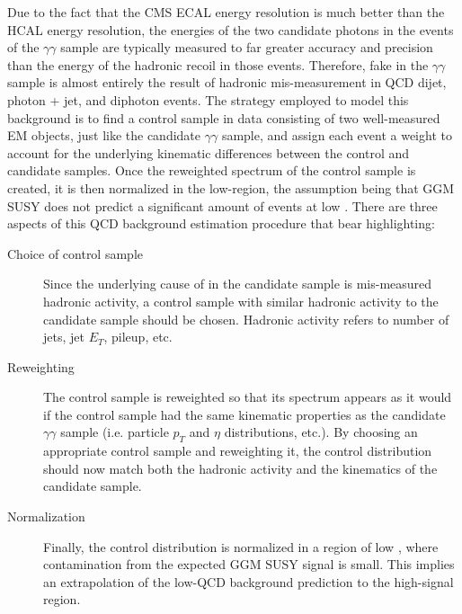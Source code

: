 \documentclass[dissertation.tex]{subfiles}
\begin{document}
Due to the fact that the CMS ECAL energy resolution is much better than the HCAL energy resolution, the energies of the two candidate photons in the events of the $\gamma\gamma$ sample are typically measured to far greater accuracy and precision than the energy of the hadronic recoil in those events.  Therefore, fake \MET in the $\gamma\gamma$ sample is almost entirely the result of hadronic mis-measurement in QCD dijet, photon + jet, and diphoton events.  The strategy employed to model this background is to find a control sample in data consisting of two well-measured EM objects, just like the candidate $\gamma\gamma$ sample, and assign each event a weight to account for the underlying kinematic differences between the control and candidate samples.  Once the reweighted \MET spectrum of the control sample is created, it is then normalized in the low-\MET region, the assumption being that GGM SUSY does not predict a significant amount of events at low \MET.  There are three aspects of this QCD background estimation procedure that bear highlighting:

\begin{description}
\item[Choice of control sample] Since the underlying cause of \MET in the candidate sample is mis-measured hadronic activity, a control sample with similar hadronic activity to the candidate sample should be chosen.  Hadronic activity refers to number of jets, jet $E_{T}$, pileup, etc.
\item[Reweighting] The control sample is reweighted so that its \MET spectrum appears as it would if the control sample had the same kinematic properties as the candidate $\gamma\gamma$ sample (i.e. particle $p_{T}$ and $\eta$ distributions, etc.).  By choosing an appropriate control sample and reweighting it, the control \MET distribution should now match both the hadronic activity and the kinematics of the candidate sample.
\item[Normalization] Finally, the control \MET distribution is normalized in a region of low \MET, where contamination from the expected GGM SUSY signal is small.  This implies an extrapolation of the low-\MET QCD background prediction to the high-\MET signal region.
\end{description}
\end{document}
